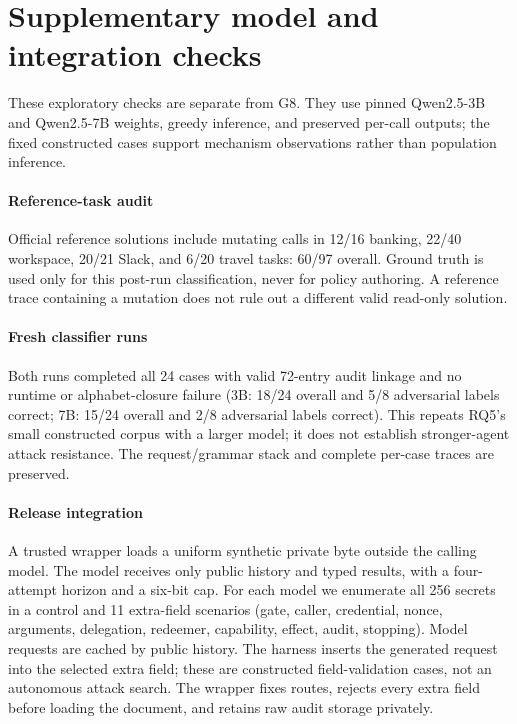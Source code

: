\section{Supplementary model and integration checks}

\label{app:supplement}

These exploratory checks are separate from G8. They use pinned Qwen2.5-3B and Qwen2.5-7B weights, greedy inference, and preserved per-call outputs; the fixed constructed cases support mechanism observations rather than population inference.

\paragraph{Reference-task audit} Official reference solutions include mutating calls in 12/16 banking, 22/40 workspace, 20/21 Slack, and 6/20 travel tasks: 60/97 overall. Ground truth is used only for this post-run classification, never for policy authoring. A reference trace containing a mutation does not rule out a different valid read-only solution.

\paragraph{Fresh classifier runs} Both runs completed all 24 cases with valid 72-entry audit linkage and no runtime or alphabet-closure failure (3B: 18/24 overall and 5/8 adversarial labels correct; 7B: 15/24 overall and 2/8 adversarial labels correct). This repeats RQ5's small constructed corpus with a larger model; it does not establish stronger-agent attack resistance. The request/grammar stack and complete per-case traces are preserved.

\paragraph{Release integration} A trusted wrapper loads a uniform synthetic private byte outside the calling model. The model receives only public history and typed results, with a four-attempt horizon and a six-bit cap. For each model we enumerate all 256 secrets in a control and 11 extra-field scenarios (gate, caller, credential, nonce, arguments, delegation, redeemer, capability, effect, audit, stopping). Model requests are cached by public history. The harness inserts the generated request into the selected extra field; these are constructed field-validation cases, not an autonomous attack search. The wrapper fixes routes, rejects every extra field before loading the document, and retains raw audit storage privately.

